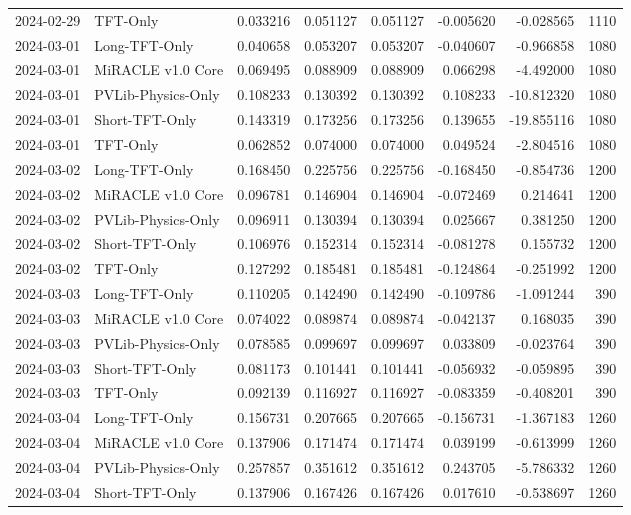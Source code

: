 \begin{tabular}{llrrrrrr}
2024-02-29 & TFT-Only & 0.033216 & 0.051127 & 0.051127 & -0.005620 & -0.028565 & 1110 \\
2024-03-01 & Long-TFT-Only & 0.040658 & 0.053207 & 0.053207 & -0.040607 & -0.966858 & 1080 \\
2024-03-01 & MiRACLE v1.0 Core & 0.069495 & 0.088909 & 0.088909 & 0.066298 & -4.492000 & 1080 \\
2024-03-01 & PVLib-Physics-Only & 0.108233 & 0.130392 & 0.130392 & 0.108233 & -10.812320 & 1080 \\
2024-03-01 & Short-TFT-Only & 0.143319 & 0.173256 & 0.173256 & 0.139655 & -19.855116 & 1080 \\
2024-03-01 & TFT-Only & 0.062852 & 0.074000 & 0.074000 & 0.049524 & -2.804516 & 1080 \\
2024-03-02 & Long-TFT-Only & 0.168450 & 0.225756 & 0.225756 & -0.168450 & -0.854736 & 1200 \\
2024-03-02 & MiRACLE v1.0 Core & 0.096781 & 0.146904 & 0.146904 & -0.072469 & 0.214641 & 1200 \\
2024-03-02 & PVLib-Physics-Only & 0.096911 & 0.130394 & 0.130394 & 0.025667 & 0.381250 & 1200 \\
2024-03-02 & Short-TFT-Only & 0.106976 & 0.152314 & 0.152314 & -0.081278 & 0.155732 & 1200 \\
2024-03-02 & TFT-Only & 0.127292 & 0.185481 & 0.185481 & -0.124864 & -0.251992 & 1200 \\
2024-03-03 & Long-TFT-Only & 0.110205 & 0.142490 & 0.142490 & -0.109786 & -1.091244 & 390 \\
2024-03-03 & MiRACLE v1.0 Core & 0.074022 & 0.089874 & 0.089874 & -0.042137 & 0.168035 & 390 \\
2024-03-03 & PVLib-Physics-Only & 0.078585 & 0.099697 & 0.099697 & 0.033809 & -0.023764 & 390 \\
2024-03-03 & Short-TFT-Only & 0.081173 & 0.101441 & 0.101441 & -0.056932 & -0.059895 & 390 \\
2024-03-03 & TFT-Only & 0.092139 & 0.116927 & 0.116927 & -0.083359 & -0.408201 & 390 \\
2024-03-04 & Long-TFT-Only & 0.156731 & 0.207665 & 0.207665 & -0.156731 & -1.367183 & 1260 \\
2024-03-04 & MiRACLE v1.0 Core & 0.137906 & 0.171474 & 0.171474 & 0.039199 & -0.613999 & 1260 \\
2024-03-04 & PVLib-Physics-Only & 0.257857 & 0.351612 & 0.351612 & 0.243705 & -5.786332 & 1260 \\
2024-03-04 & Short-TFT-Only & 0.137906 & 0.167426 & 0.167426 & 0.017610 & -0.538697 & 1260 \\

\end{tabular}
